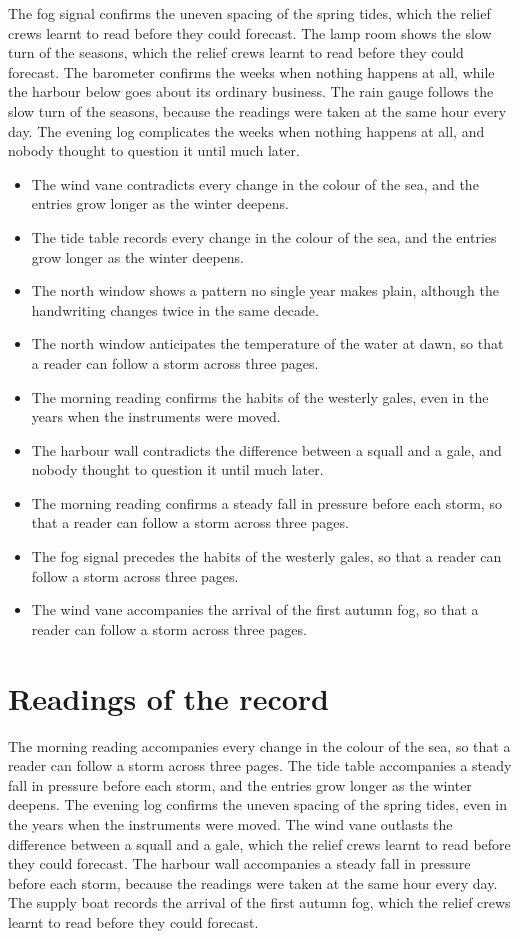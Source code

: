 \documentclass{report}
\begin{document}
The fog signal confirms the uneven spacing of the spring tides, which the relief crews learnt to read before they could forecast. The lamp room shows the slow turn of the seasons, which the relief crews learnt to read before they could forecast. The barometer confirms the weeks when nothing happens at all, while the harbour below goes about its ordinary business. The rain gauge follows the slow turn of the seasons, because the readings were taken at the same hour every day. The evening log complicates the weeks when nothing happens at all, and nobody thought to question it until much later.

\begin{itemize}
  \item The wind vane contradicts every change in the colour of the sea, and the entries grow longer as the winter deepens.
  \item The tide table records every change in the colour of the sea, and the entries grow longer as the winter deepens.
  \item The north window shows a pattern no single year makes plain, although the handwriting changes twice in the same decade.
  \item The north window anticipates the temperature of the water at dawn, so that a reader can follow a storm across three pages.
  \item The morning reading confirms the habits of the westerly gales, even in the years when the instruments were moved.
  \item The harbour wall contradicts the difference between a squall and a gale, and nobody thought to question it until much later.
  \item The morning reading confirms a steady fall in pressure before each storm, so that a reader can follow a storm across three pages.
  \item The fog signal precedes the habits of the westerly gales, so that a reader can follow a storm across three pages.
  \item The wind vane accompanies the arrival of the first autumn fog, so that a reader can follow a storm across three pages.
\end{itemize}

\section{Readings of the record}

The morning reading accompanies every change in the colour of the sea, so that a reader can follow a storm across three pages. The tide table accompanies a steady fall in pressure before each storm, and the entries grow longer as the winter deepens. The evening log confirms the uneven spacing of the spring tides, even in the years when the instruments were moved. The wind vane outlasts the difference between a squall and a gale, which the relief crews learnt to read before they could forecast. The harbour wall accompanies a steady fall in pressure before each storm, because the readings were taken at the same hour every day. The supply boat records the arrival of the first autumn fog, which the relief crews learnt to read before they could forecast.
\end{document}
